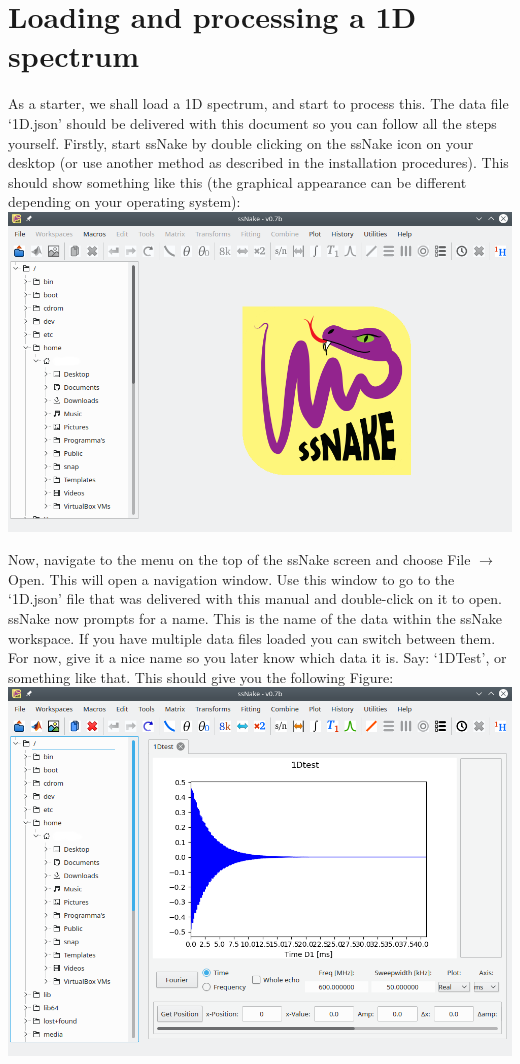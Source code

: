 \documentclass[11pt,a4paper]{article}
\begin{document}
\section{Loading and processing a 1D spectrum}
As a starter, we shall load a 1D spectrum, and start to process this. The data file `1D.json' should
be delivered with this document so you can follow all the steps yourself. Firstly, start ssNake by
double clicking on the ssNake icon on your desktop (or use another method as described in the
installation procedures). This should show something like this (the graphical appearance can be
different depending on your operating system):\\
\includegraphics[width=\linewidth]{Images/StartScreen.png}

Now, navigate to the menu on the top of the ssNake screen and choose File $\rightarrow$ Open. This
will open a navigation window. Use this window to go to the `1D.json' file that was delivered with
this manual and double-click on it to open. ssNake now prompts for a name. This is the name of the
data within the ssNake workspace. If you have multiple data files loaded you can switch between
them. For now, give it a nice name so you later know which data it is. Say: `1DTest', or something
like that. This should give you the following Figure:\\
\includegraphics[width=\linewidth]{Images/1Dfid.png}
\end{document}
